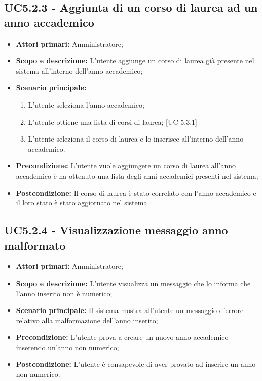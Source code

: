 \documentclass[AnalisiDeiRequisiti.tex]{subfiles}
\begin{document}
\subsection{UC5.2.3 - Aggiunta di un corso di laurea ad un anno accademico}
\begin{itemize}
	\item \textbf{Attori primari:} Amministratore;
	\item \textbf{Scopo e descrizione:} L'utente aggiunge un corso di laurea già presente nel sistema all'interno dell'anno accademico;
	\item \textbf{Scenario principale:}
	\begin{enumerate}
		\item L'utente seleziona l'anno accademico;
		\item L'utente ottiene una lista di corsi di laurea; [UC 5.3.1]
		\item L'utente seleziona il corso di laurea e lo inserisce all'interno dell'anno accademico.
	\end{enumerate}
	\item \textbf{Precondizione:} L'utente vuole aggiungere un corso di laurea all'anno accademico è ha ottenuto una lista degli anni accademici presenti nel sistema; 
	\item \textbf{Postcondizione:} Il corso di laurea è stato correlato con l'anno accademico e il loro stato è stato aggiornato nel sistema.
\end{itemize}
\subsection{UC5.2.4 - Visualizzazione messaggio anno malformato}
\begin{itemize}
	\item \textbf{Attori primari:} Amministratore;
	\item \textbf{Scopo e descrizione:} L'utente visualizza un messaggio che lo informa che l'anno inserito non è numerico;
	\item \textbf{Scenario principale:} Il sistema mostra all'utente un messaggio d'errore relativo alla malformazione dell'anno inserito;
	\item \textbf{Precondizione:} L'utente prova a creare un nuovo anno accademico inserendo un'anno non numerico; 
	\item \textbf{Postcondizione:} L'utente è consapevole di aver provato ad inserire un anno non numerico.
\end{itemize}
\end{document}
